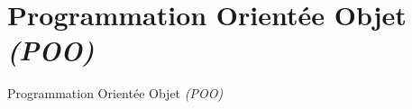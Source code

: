 \section{Programmation Orientée Objet \emph{(POO)}}

\begingroup
{}
\begin{frame}
    \begin{center}
        \vspace{1cm}
        {\Large\color{background}
            Programmation Orientée Objet \emph{(POO)}
        }
    \end{center}
\end{frame}
\endgroup
